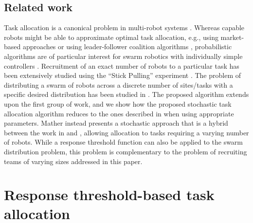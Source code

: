 \documentclass{TeXstyles/DARS/svmult}  %
\begin{document}
\subsection{Related work}
Task allocation is a canonical problem in multi-robot systems \cite{Gerkey2004}. Whereas capable robots might be able to approximate optimal task allocation, e.g., using market-based approaches \cite{amstutz2008distributed,vig2007coalition} or using  leader-follower coalition algorithms \cite{Chen2011}, probabilistic algorithms are of particular interest for swarm robotics with individually simple controllers \cite{dantu2012comparison}. Recruitment of an exact number of robots to a particular task has been extensively studied using the ``Stick Pulling'' experiment \cite{Lerman2001,Martinoli2004}. The problem of distributing a swarm of robots across a discrete number of sites/tasks with a specific desired distribution has been studied in \cite{Berman2009,Correll2008}. The proposed algorithm extends upon the first group of work, and we show how the proposed stochastic task allocation algorithm reduces to the ones described in \cite{Lerman2001,Martinoli2004} when using appropriate parameters.  Mather \cite{mather2010towards} instead presents a stochastic approach that is a hybrid between the work in \cite{Berman2009} and \cite{Martinoli2004}, allowing allocation to tasks requiring a varying number of robots.
While a response threshold function can also be applied to the swarm distribution problem, this problem is complementary to the problem of recruiting teams of varying sizes addressed in this paper. 



\section{Response threshold-based task allocation}\label{sec:expsetup}
\end{document}
